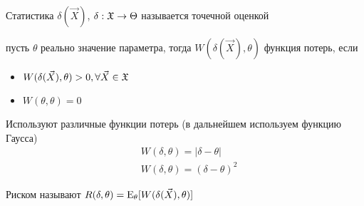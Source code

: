 \documentclass[main.tex]{subfiles}
\begin{document}
\begin{definition}
	Статистика $\delta ( \vec{X} )$, $\delta : \mathfrak{X} \rightarrow \Theta$ называется точечной оценкой
\end{definition}

\begin{definition}
	пусть $\theta$ реально значение параметра, тогда $W(\delta (\vec{X}),\theta)$ функция потерь, если
	\begin{itemize}
	 	\item $W(\delta (\vec{X}),\theta)>0,\forall \vec{X} \in \mathfrak{X}$
	 	\item $W(\theta,\theta)=0$
	 \end{itemize} 
\end{definition}
Используют различные функции потерь (в дальнейшем используем функцию Гаусса)
\begin{align}
	& W(\delta,\theta)=|\delta-\theta| \tag{Лаплас} \\
	& W(\delta,\theta)=(\delta-\theta)^2 \tag{Гаусс}
\end{align}

\begin{definition}[Риск]
	Риском называют $R(\delta,\theta) = \mathrm{E}_\theta[W(\delta(\vec{X}),\theta)]$ 
\end{definition}
\end{document}
